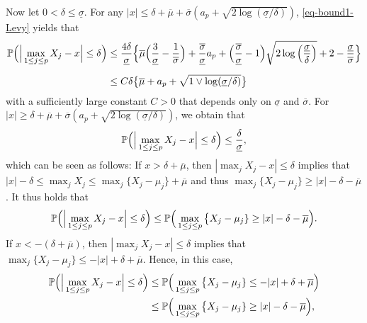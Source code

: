 \documentclass[a4paper,12pt]{article}
\numberwithin{equation}{section}
\begin{document}
Now let $0 < \delta \le \underline{\sigma}$. For any $|x| \le \delta + \overline{\mu} + \overline{\sigma}(a_p + \sqrt{2\log(\underline{\sigma}/\delta)})$, \eqref{eq-bound1-Levy} yields that 
\begin{align}
\mathbb{P} \Big( \Big| \max_{1 \le j \le p} X_j - x \Big| \le \delta \Big) 
 & \le \frac{4 \delta}{\underline{\sigma}} \Big\{ \overline{\mu} \Big( \frac{3}{\underline{\sigma}} - \frac{1}{\overline{\sigma}} \Big) + \frac{\overline{\sigma}}{\underline{\sigma}} a_p + \Big( \frac{\overline{\sigma}}{\underline{\sigma}} - 1 \Big) \sqrt{2\log\Big(\frac{\underline{\sigma}}{\delta}\Big)} + 2 - \frac{\underline{\sigma}}{\overline{\sigma}} \Big\} \nonumber \\[0.2cm]
 & \le C \delta \big\{ \overline{\mu} + a_p + \sqrt{1 \vee \log(\underline{\sigma}/\delta)} \big\} \label{eq-bound2-Levy}
\end{align}
with a sufficiently large constant $C > 0$ that depends only on $\underline{\sigma}$ and $\overline{\sigma}$. For $|x| \ge \delta + \overline{\mu} + \overline{\sigma}(a_p + \sqrt{2\log(\underline{\sigma}/\delta)})$, we obtain that 
\begin{equation}\label{eq-bound3-Levy}
\mathbb{P} \Big( \Big| \max_{1 \le j \le p} X_j - x \Big| \le \delta \Big) \le \frac{\delta}{\underline{\sigma}}, 
\end{equation}
which can be seen as follows: If $x > \delta + \overline{\mu}$, then $|\max_j X_j - x| \le \delta$ implies that $|x| - \delta \le \max_j X_j \le \max_j \{ X_j - \mu_j \} + \overline{\mu}$ and thus $\max_j \{ X_j - \mu_j \} \ge |x| - \delta - \overline{\mu}$. It thus holds that 
\begin{equation}\label{eq-bound3-Levy-prep1}
\mathbb{P} \Big( \Big| \max_{1 \le j \le p} X_j - x \Big| \le \delta \Big) \le \mathbb{P} \Big( \max_{1 \le j \le p} \big\{ X_j - \mu_j \} \ge |x| - \delta - \overline{\mu} \Big). 
\end{equation}
If $x < - (\delta + \overline{\mu})$, then $|\max_j X_j - x| \le \delta$ implies that $\max_j \{ X_j - \mu_j \} \le -|x| + \delta + \overline{\mu}$. Hence, in this case,
\begin{align}
\mathbb{P} \Big( \Big| \max_{1 \le j \le p} X_j - x \Big| \le \delta \Big) 
 & \le \mathbb{P} \Big( \max_{1 \le j \le p} \big\{ X_j - \mu_j \} \le -|x| + \delta + \overline{\mu} \Big) \nonumber \\
 & \le \mathbb{P} \Big( \max_{1 \le j \le p} \big\{ X_j - \mu_j \} \ge |x| - \delta - \overline{\mu} \Big), \label{eq-bound3-Levy-prep2}
\end{align}
\end{document}
